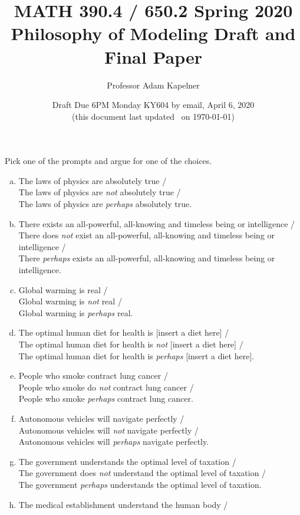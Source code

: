 \documentclass[12pt]{article}
\title{MATH 390.4 / 650.2 Spring 2020 \\ Philosophy of Modeling Draft and Final Paper}
\author{Professor Adam Kapelner} %
\date{Draft Due 6PM Monday KY604 by email, April 6, 2020 \\ \vspace{0.5cm} \small (this document last updated \currenttime~on \today)}
\begin{document}
\maketitle

\noindent Pick one of the prompts and argue for one of the choices. 

\begin{enumerate}[(a)]
\item The laws of physics are absolutely true / \\
The laws of physics are \textit{not} absolutely true / \\
The laws of physics are \textit{perhaps} absolutely true.
\item There exists an all-powerful, all-knowing and timeless being or intelligence / \\
There does \textit{not} exist an all-powerful, all-knowing and timeless being or intelligence / \\
There \textit{perhaps} exists an all-powerful, all-knowing and timeless being or intelligence.
\item Global warming is real / \\
Global warming is \textit{not} real / \\
Global warming is \textit{perhaps} real.
\item The optimal human diet for health is [insert a diet here] / \\
The optimal human diet for health is \textit{not} [insert a diet here] / \\
The optimal human diet for health is \textit{perhaps} [insert a diet here].
\item People who smoke contract lung cancer / \\
People who smoke do \textit{not} contract lung cancer / \\
People who smoke \textit{perhaps} contract lung cancer.
\item Autonomous vehicles will navigate perfectly / \\
Autonomous vehicles will \textit{not} navigate perfectly / \\
Autonomous vehicles will \textit{perhaps} navigate perfectly.
\item The government understands the optimal level of taxation / \\
The government does \textit{not} understand the optimal level of taxation / \\
The government \textit{perhaps} understands the optimal level of taxation.
\item The medical establishment understand the human body / \\

\end{enumerate}
\end{document}
